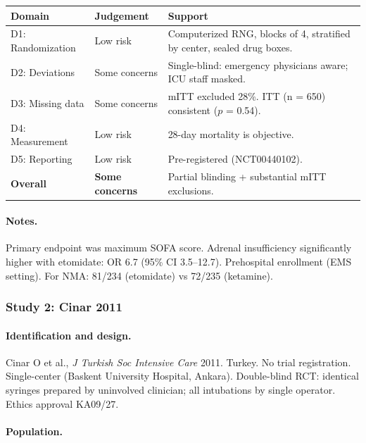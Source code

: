 \documentclass[11pt]{article}
\begin{document}
\begin{table}[H]
\centering\footnotesize
\begin{tabularx}{\textwidth}{L{3cm} C{2cm} X}
\toprule
\textbf{Domain} & \textbf{Judgement} & \textbf{Support} \\
\midrule
D1: Randomization & Low risk & Computerized RNG, blocks of 4, stratified by center, sealed drug boxes. \\
D2: Deviations & Some concerns & Single-blind: emergency physicians aware; ICU staff masked. \\
D3: Missing data & Some concerns & mITT excluded 28\%. ITT (n = 650) consistent ($p$ = 0.54). \\
D4: Measurement & Low risk & 28-day mortality is objective. \\
D5: Reporting & Low risk & Pre-registered (NCT00440102). \\
\textbf{Overall} & \textbf{Some concerns} & Partial blinding + substantial mITT exclusions. \\
\bottomrule
\end{tabularx}
\end{table}

\paragraph{Notes.}
Primary endpoint was maximum SOFA score. Adrenal insufficiency significantly higher with etomidate: OR 6.7 (95\% CI 3.5--12.7). Prehospital enrollment (EMS setting). For NMA: 81/234 (etomidate) vs 72/235 (ketamine).

\bigskip

\subsubsection{Study 2: Cinar 2011}

\paragraph{Identification and design.}
Cinar O et al., \textit{J Turkish Soc Intensive Care} 2011. Turkey. No trial registration. Single-center (Baskent University Hospital, Ankara). Double-blind RCT: identical syringes prepared by uninvolved clinician; all intubations by single operator. Ethics approval KA09/27.

\paragraph{Population.}
\end{document}
